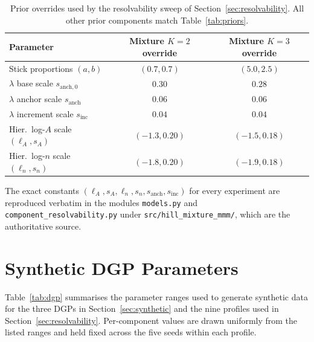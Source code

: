 \documentclass[11pt]{article}
\begin{document}
\begin{table}[ht]
\centering
\caption{Prior overrides used by the resolvability sweep of Section~\ref{sec:resolvability}. All other prior components match Table~\ref{tab:priors}.}
\label{tab:resolvability_priors}
\begin{tabular}{lcc}
\toprule
Parameter & Mixture $K=2$ override & Mixture $K=3$ override \\
\midrule
Stick proportions $(a, b)$       & $(0.7, 0.7)$  & $(5.0, 2.5)$ \\
$\lambda$ base scale $s_{\text{anch},0}$  & $0.30$ & $0.28$ \\
$\lambda$ anchor scale $s_{\text{anch}}$ & $0.06$ & $0.06$ \\
$\lambda$ increment scale $s_{\text{inc}}$ & $0.04$ & $0.04$ \\
Hier.\ log-$A$ scale $(\ell_A, s_A)$ & $(-1.3, 0.20)$ & $(-1.5, 0.18)$ \\
Hier.\ log-$n$ scale $(\ell_n, s_n)$ & $(-1.8, 0.20)$ & $(-1.9, 0.18)$ \\
\bottomrule
\end{tabular}
\end{table}

\noindent The exact constants $(\ell_A, s_A, \ell_n, s_n, s_{\text{anch}}, s_{\text{inc}})$ for every experiment are reproduced verbatim in the modules \texttt{models.py} and \texttt{component\_resolvability.py} under \texttt{src/hill\_mixture\_mmm/}, which are the authoritative source.

\section{Synthetic DGP Parameters}
\label{app:dgp}

Table~\ref{tab:dgp} summarises the parameter ranges used to generate synthetic data for the three DGPs in Section~\ref{sec:synthetic} and the nine profiles used in Section~\ref{sec:resolvability}. Per-component values are drawn uniformly from the listed ranges and held fixed across the five seeds within each profile.
\end{document}
